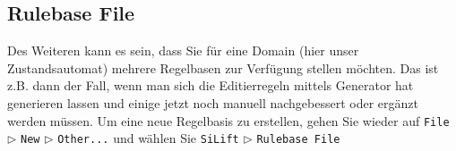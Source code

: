 \documentclass[a4paper]{scrartcl}
\begin{document}
%
% 
% 
% 
% 
% 




\subsection{Rulebase File}
\label{sec:rbfile}

Des Weiteren kann es sein, dass Sie für eine Domain (hier unser Zustandsautomat) mehrere Regelbasen zur Verfügung stellen möchten.
Das ist z.B. dann der Fall, wenn man sich die Editierregeln mittels Generator hat generieren lassen und einige jetzt noch manuell nachgebessert oder ergänzt werden müssen.
Um eine neue Regelbasis zu erstellen, gehen Sie wieder auf \texttt{File} $\triangleright$ \texttt{New} $\triangleright$ \texttt{Other...} und wählen Sie  \texttt{SiLift} $\triangleright$ \texttt{Rulebase File}
\end{document}

